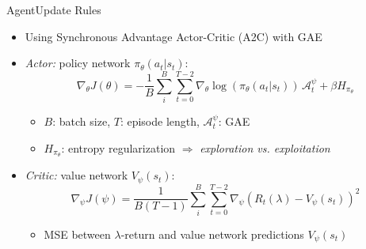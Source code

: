 \documentclass[table]{beamer}
\begin{document}
\begin{frame}{Agent}{Update Rules}

\begin{itemize}
\item Using Synchronous Advantage Actor-Critic (A2C) with GAE
\item \emph{Actor:} policy network $\pi_{\theta}(a_t | s_t)$:
\begin{equation*}
  \nabla_{\theta} J(\theta) = - \frac{1}{B} \sum_{i}^{B} \sum_{t=0}^{T-2} \nabla_{\theta} \log(\pi_{\theta} (a_t | s_t)) \, \mathcal{A}_{t}^{\psi} + \beta H_{\pi_{\theta}}
\end{equation*}
  \begin{itemize}
  \item $B$: batch size, $T$: episode length, $\mathcal{A}_t^{\psi}$: GAE
  \item $H_{\pi_{\theta}}$: entropy regularization $\Rightarrow$ \emph{exploration vs. exploitation}
  \end{itemize}
\item<2-> \emph{Critic:} value network $V_{\psi}(s_t)$:
  \begin{equation*}
    \nabla_{\psi} J(\psi)= \frac{1}{B (T-1)} \sum_{i}^{B} \sum_{t=0}^{T-2} \nabla_{\psi} (R_t(\lambda) - V_{\psi}(s_t))^2
  \end{equation*}
  \begin{itemize}
  \item MSE between $\lambda$-return and value network predictions $V_{\psi}(s_t)$
  \end{itemize}
\end{itemize}
\end{frame}
\end{document}
